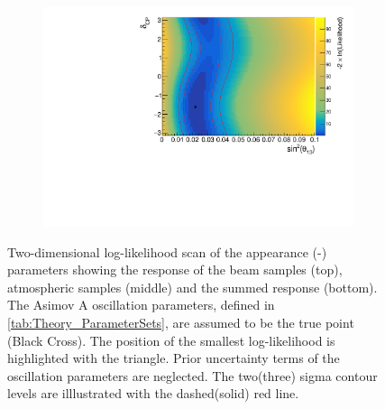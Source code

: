 \begin{figure}[h]
\begin{subfigure}[t]{1.0\textwidth}
    \includegraphics[width=\textwidth, trim={0mm 0mm 0mm 0mm}, clip,page=3]{Figures/OA/AppearanceScans.pdf}
  \end{subfigure}
  \caption{Two-dimensional log-likelihood scan of the appearance (\sinsqreac-\dcp) parameters showing the response of the beam samples (top), atmospheric samples (middle) and the summed response (bottom). The Asimov A oscillation parameters, defined in \autoref{tab:Theory_ParameterSets}, are assumed to be the true point (Black Cross). The position of the smallest log-likelihood is highlighted with the triangle. Prior uncertainty terms of the oscillation parameters are neglected. The two(three) sigma contour levels are illlustrated with the dashed(solid) red line.}
  \label{fig:OscillationAnalysis_2DLLHOscScans_App}
\end{figure}

